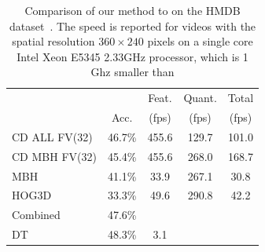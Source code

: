 \documentclass[10pt,twocolumn,letterpaper]{article}
\begin{document}
\begin{table}
\begin{center}
\begin{tabular}{|l|c|c|c|c|}
\hline
		 				&  	 		& Feat.                    & Quant. 	& Total	\\
		 				& Acc.		& (fps)                    & (fps) 	& (fps)	\\\hline
CD ALL FV(32)		& 46.7\% 	& 455.6                    & 129.7 	& 101.0	\\ %
CD MBH FV(32)		& 45.4\% 	& 455.6                    & 268.0 	& 168.7	\\ %
\hline
MBH \cite{Feng13}		& 41.1\% 	& 33.9            	     	& 267.1 & 30.8	\\ %
HOG3D \cite{Feng13}	& 33.3\% 	& 49.6            	   	& 290.8 & 42.2	\\ %
Combined \cite{Feng13} & 47.6\% & 									&			&			\\
DT	\cite{Wang12}			& 48.3\%& 3.1								&			& \\ %
\end{tabular}
\smallskip
\caption{Comparison of our method to \cite{Feng13} on the HMDB dataset~\cite{Kuehne11}. The speed is reported for videos with the spatial resolution $360\times 240$ pixels on a single core Intel Xeon E5345 2.33GHz processor, which is 1 Ghz smaller than \cite{Feng13}}
\label{tab:hmdb_comparison}
\mbox{}\vspace{-1cm}\\
\end{center}
\end{table}
\end{document}
